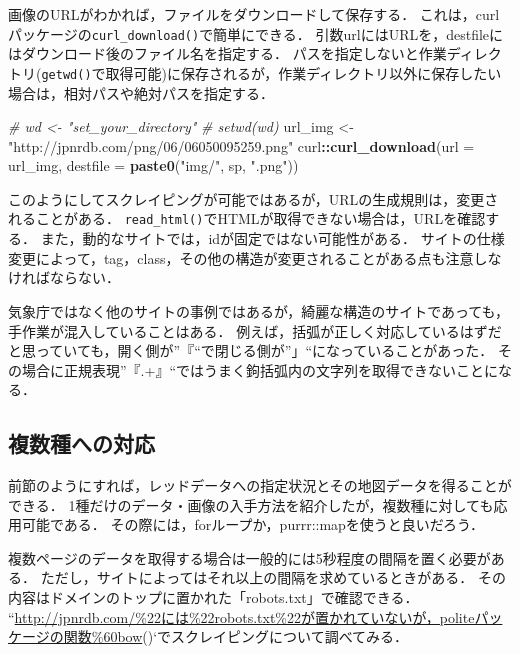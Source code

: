 \documentclass[
]{article}
\newenvironment{Shaded}{\begin{snugshade}}{\end{snugshade}}
\newcommand{\AttributeTok}[1]{\textcolor[rgb]{0.13,0.29,0.53}{#1}}
\newcommand{\CommentTok}[1]{\textcolor[rgb]{0.56,0.35,0.01}{\textit{#1}}}
\newcommand{\FunctionTok}[1]{\textcolor[rgb]{0.13,0.29,0.53}{\textbf{#1}}}
\newcommand{\NormalTok}[1]{#1}
\newcommand{\OtherTok}[1]{\textcolor[rgb]{0.56,0.35,0.01}{#1}}
\newcommand{\SpecialCharTok}[1]{\textcolor[rgb]{0.81,0.36,0.00}{\textbf{#1}}}
\newcommand{\StringTok}[1]{\textcolor[rgb]{0.31,0.60,0.02}{#1}}
\begin{document}
画像のURLがわかれば，ファイルをダウンロードして保存する．
これは，curlパッケージの\texttt{curl\_download()}で簡単にできる．
引数urlにはURLを，destfileにはダウンロード後のファイル名を指定する．
パスを指定しないと作業ディレクトリ(\texttt{getwd()}で取得可能)に保存されるが，作業ディレクトリ以外に保存したい場合は，相対パスや絶対パスを指定する．

\begin{Shaded}
\begin{Highlighting}[]
  \CommentTok{\# wd \textless{}{-} "set\_your\_directory"}
  \CommentTok{\# setwd(wd)}
\NormalTok{url\_img }\OtherTok{\textless{}{-}} \StringTok{"http://jpnrdb.com/png/06/06050095259.png"}
\NormalTok{curl}\SpecialCharTok{::}\FunctionTok{curl\_download}\NormalTok{(}\AttributeTok{url =}\NormalTok{ url\_img, }\AttributeTok{destfile =} \FunctionTok{paste0}\NormalTok{(}\StringTok{"img/"}\NormalTok{, sp, }\StringTok{".png"}\NormalTok{))}
\end{Highlighting}
\end{Shaded}

このようにしてスクレイピングが可能ではあるが，URLの生成規則は，変更されることがある．
\texttt{read\_html()}でHTMLが取得できない場合は，URLを確認する．
また，動的なサイトでは，idが固定ではない可能性がある．
サイトの仕様変更によって，tag，class，その他の構造が変更されることがある点も注意しなければならない．

気象庁ではなく他のサイトの事例ではあるが，綺麗な構造のサイトであっても，手作業が混入していることはある．
例えば，括弧が正しく対応しているはずだと思っていても，開く側が''『``で閉じる側が''」``になっていることがあった．
その場合に正規表現''『.+』``ではうまく鉤括弧内の文字列を取得できないことになる．

\hypertarget{ux8907ux6570ux7a2eux3078ux306eux5bfeux5fdc}{%
\subsection{複数種への対応}\label{ux8907ux6570ux7a2eux3078ux306eux5bfeux5fdc}}

前節のようにすれば，レッドデータへの指定状況とその地図データを得ることができる．
1種だけのデータ・画像の入手方法を紹介したが，複数種に対しても応用可能である．
その際には，forループか，purrr::mapを使うと良いだろう．

複数ページのデータを取得する場合は一般的には5秒程度の間隔を置く必要がある．
ただし，サイトによってはそれ以上の間隔を求めているときがある．
その内容はドメインのトップに置かれた「robots.txt」で確認できる．
``\url{http://jpnrdb.com/\%22には\%22robots.txt\%22が置かれていないが，politeパッケージの関数\%60bow}()`でスクレイピングについて調べてみる．
\end{document}
